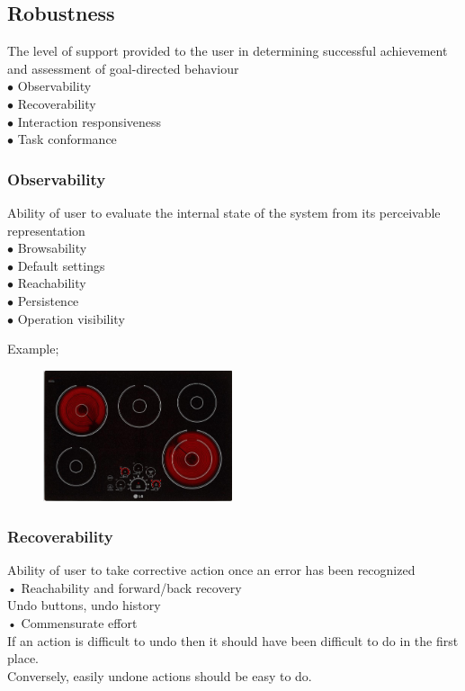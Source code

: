 \documentclass[]{project_plan}
\newcommand{\bulletPoint}{\hspace{-3.1pt}$\bullet$ \hspace{5pt}}
\begin{document}
\subsection{Robustness}
The level of support provided to the user in determining successful achievement
and assessment of goal-directed behaviour\\
\bulletPoint Observability\\
\bulletPoint Recoverability\\
\bulletPoint Interaction responsiveness\\
\bulletPoint Task conformance

\subsubsection{Observability}
Ability of user to evaluate the internal state of the system from its perceivable
representation\\
\bulletPoint Browsability\\
\bulletPoint Default settings\\
\bulletPoint Reachability\\
\bulletPoint Persistence\\
\bulletPoint Operation visibility

\newpage

Example;
\begin{figure}[h!]
  \centering
  \includegraphics[width=15em]{observability_example.png}
\end{figure}

\subsubsection{Recoverability}
Ability of user to take corrective action once an error has been recognized\\
• Reachability and forward/back recovery\\Undo buttons, undo history\\
• Commensurate effort\\
If an action is difficult to undo then it should have been
difficult to do in the first place.\\
Conversely, easily undone actions should be easy to do.
\end{document}
